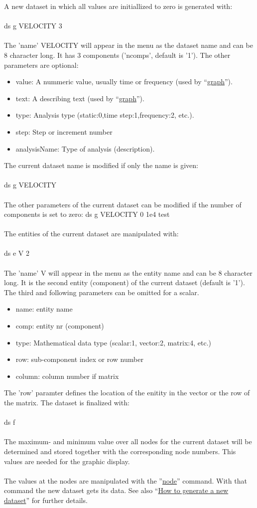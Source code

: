 \documentclass{article}
\providecommand{\htmlref}[2]{\hyperref[#2]{#1}}
\begin{document}
A new dataset in which all values are initiallized to zero is generated with:\\\\ 
ds g VELOCITY 3\\\\
The 'name' VELOCITY will appear in the menu as the dataset name and can be 8 character long. It has 3 components ('ncomps', default is '1'). The other parameters are optional:
\begin{itemize}
\item  value: A nummeric value, usually time or frequency (used by ``\htmlref{graph}{graph}'').
\item  text:  A describing text (used by ``\htmlref{graph}{graph}'').
\item  type:  Analysis type (static:0,time step:1,frequency:2, etc.).
\item  step:  Step or increment number
\item  analysisName: Type of analysis (description).
\end{itemize}
The current dataset name is modified if only the name is given:\\\\ 
ds g VELOCITY\\\\
The other parameters of the current dataset can be modified if the number of components is set to zero:
ds g VELOCITY 0 1e4 test\\\\
The entities of the current dataset are manipulated with:\\\\
ds e V 2\\\\
The 'name' V will appear in the menu as the entity name and can be 8 character long. It is the second entity (component) of the current dataset (default is '1'). The third and following parameters can be omitted for a scalar.
\begin{itemize}
\item  name:   entity name
\item  comp:   entity nr (component)
\item  type:   Mathematical data type (scalar:1, vector:2, matrix:4, etc.)
\item  row:    sub-component index or row number
\item  column: column number if matrix
\end{itemize}
The 'row' paramter defines the location of the enitity in the vector or the row of the matrix. 
The dataset is finalized with:\\\\
ds f\\\\
The maximum- and minimum value over all nodes for the current dataset will be determined and stored together with the corresponding node numbers. This values are needed for the graphic display.\\\\
The values at the nodes are manipulated with the ''\htmlref{node}{node}'' command. With that command the new dataset gets its data. See also ``\htmlref{How to generate a new dataset}{How to generate a new dataset}'' for further details.
\end{document}
